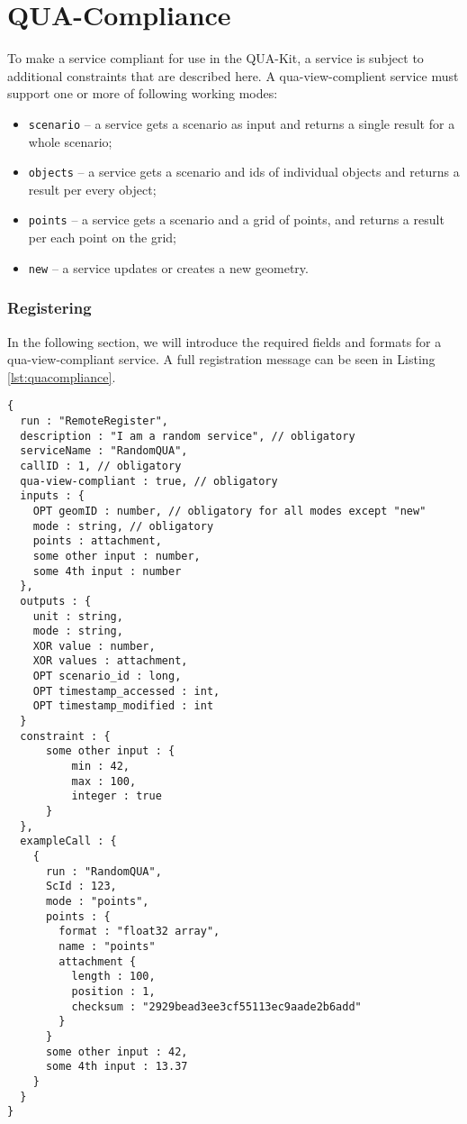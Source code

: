 \section{QUA-Compliance}
\label{ch:quacompliance}

To make a service compliant for use in the QUA-Kit, a service is subject to additional constraints that are described here.
A qua-view-complient service must support one or more of following working modes:
\begin{itemize}
\item 
    \texttt{scenario} -- a service gets a scenario as input and returns a single result for a whole scenario;
\item 
    \texttt{objects} -- a service gets a scenario and ids of individual objects and returns a result per every object;
\item 
    \texttt{points} -- a service gets a scenario and a grid of points, and returns a result per each point on the grid;
\item 
    \texttt{new} -- a service updates or creates a new geometry.
\end{itemize}

\subsubsection{Registering}

In the following section, we will introduce the required fields and formats for a qua-view-compliant service. A full registration message can be seen in Listing \ref{lst:quacompliance}.

\begin{lstlisting}[caption={Registering a QUA-compliant service}, label={lst:quacompliance}]
{
  run : "RemoteRegister",
  description : "I am a random service", // obligatory
  serviceName : "RandomQUA",
  callID : 1, // obligatory
  qua-view-compliant : true, // obligatory
  inputs : {
    OPT geomID : number, // obligatory for all modes except "new"
    mode : string, // obligatory
    points : attachment,
    some other input : number,
    some 4th input : number
  },
  outputs : {
    unit : string,
    mode : string,
    XOR value : number,
    XOR values : attachment,
    OPT scenario_id : long,
    OPT timestamp_accessed : int,
    OPT timestamp_modified : int
  }
  constraint : {
      some other input : {
          min : 42,
          max : 100,
          integer : true
      }
  },
  exampleCall : {
    {
      run : "RandomQUA",
      ScId : 123,
      mode : "points",
      points : {
        format : "float32 array",
        name : "points"
        attachment {
          length : 100,
          position : 1,
          checksum : "2929bead3ee3cf55113ec9aade2b6add"
        }
      }
      some other input : 42,
      some 4th input : 13.37
    }
  }
}
\end{lstlisting}

